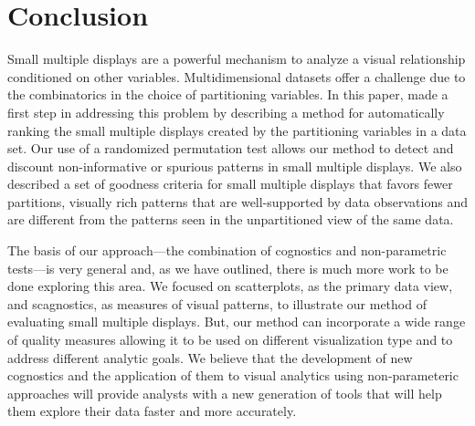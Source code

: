 \section{Conclusion}

Small multiple displays are a powerful mechanism to analyze a visual relationship conditioned on other variables. Multidimensional datasets offer a challenge due to the combinatorics in the choice of partitioning variables. In this paper, made a first step in addressing this problem by describing a method for automatically ranking the small multiple displays created by the partitioning variables in a data set.
Our use of a randomized permutation test allows our method to detect and discount non-informative or spurious patterns in small multiple displays.
We also described a set of goodness criteria for small multiple displays that favors fewer partitions, visually rich patterns that are well-supported by data observations and are different from the patterns seen in the unpartitioned view of the same data.

The basis of our approach---the combination of cognostics and non-parametric tests---is very general and, as we have outlined, there is much more work to be done exploring this area. We focused on scatterplots, as the primary data view, and scagnostics, as measures of visual patterns, to illustrate our method of evaluating small multiple displays. But, our method can incorporate a wide range of quality measures allowing it to be used on different visualization type and to address different analytic goals. We believe that the development of new cognostics and the application of them to visual analytics using non-parameteric approaches will provide analysts with a new generation of tools that will help them explore their data faster and more accurately.

